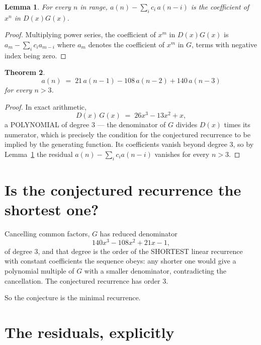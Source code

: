 \documentclass[11pt,a4paper]{article}
\theoremstyle{plain}
\newtheorem{theorem}{Theorem}
\newtheorem{lemma}[theorem]{Lemma}
\theoremstyle{definition}
\begin{document}
\begin{lemma}\label{lem:key}
For every $n$ in range, $a(n)-\sum_i c_i\,a(n-i)$ is the coefficient of $x^{n}$ in
$D(x)G(x)$.
\end{lemma}

\begin{proof}
Multiplying power series, the coefficient of $x^{m}$ in $D(x)G(x)$ is
$a_m-\sum_i c_i a_{m-i}$ where $a_m$ denotes the coefficient of $x^{m}$ in $G$, terms with
negative index being zero.
\end{proof}

\begin{theorem}
\[
a(n)\;=\;21\,a(n-1) - 108\,a(n-2) + 140\,a(n-3)
\]
for every $n>3$.
\end{theorem}

\begin{proof}
In exact arithmetic,
\[
D(x)\,G(x)\;=\;26 x^{3} - 13 x^{2} + x,
\]
a POLYNOMIAL of degree $3$ --- the denominator of $G$ divides $D(x)$ times its numerator,
which is precisely the condition for the conjectured recurrence to be implied by the
generating function. Its coefficients vanish beyond degree $3$, so by
Lemma~\ref{lem:key} the residual $a(n)-\sum_ic_ia(n-i)$ vanishes for every
$n>3$.
\end{proof}

\section{Is the conjectured recurrence the shortest one?}

Cancelling common factors, $G$ has reduced denominator
\[
140 x^{3} - 108 x^{2} + 21 x - 1,
\]
of degree $3$, and that degree is the order of the SHORTEST linear recurrence with
constant coefficients the sequence obeys: any shorter one would give a polynomial multiple of
$G$ with a smaller denominator, contradicting the cancellation. The conjectured recurrence has
order $3$.

So the conjecture is the minimal recurrence.

\section{The residuals, explicitly}
\end{document}
